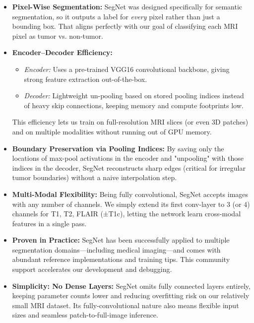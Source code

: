 \begin{itemize}
    \item \textbf{Pixel-Wise Segmentation:} SegNet was designed specifically for semantic segmentation, so it outputs a label for \emph{every} pixel rather than just a bounding box. That aligns perfectly with our goal of classifying each MRI pixel as tumor vs. non-tumor.
    
    \item \textbf{Encoder–Decoder Efficiency:}
    \begin{itemize}
        \item \emph{Encoder:} Uses a pre-trained VGG16 convolutional backbone, giving strong feature extraction out-of-the-box.
        \item \emph{Decoder:} Lightweight un-pooling based on stored pooling indices instead of heavy skip connections, keeping memory and compute footprints low.
    \end{itemize}
    This efficiency lets us train on full-resolution MRI slices (or even 3D patches) and on multiple modalities without running out of GPU memory.
    
    \item \textbf{Boundary Preservation via Pooling Indices:} By saving only the locations of max-pool activations in the encoder and "unpooling" with those indices in the decoder, SegNet reconstructs sharp edges (critical for irregular tumor boundaries) without a naive interpolation step.
    
    \item \textbf{Multi-Modal Flexibility:} Being fully convolutional, SegNet accepts images with any number of channels. We simply extend its first conv-layer to 3 (or 4) channels for T1, T2, FLAIR (±T1c), letting the network learn cross-modal features in a single pass.
    
    \item \textbf{Proven in Practice:} SegNet has been successfully applied to multiple segmentation domains—including medical imaging—and comes with abundant reference implementations and training tips. This community support accelerates our development and debugging.
    
    \item \textbf{Simplicity: No Dense Layers:} SegNet omits fully connected layers entirely, keeping parameter counts lower and reducing overfitting risk on our relatively small MRI dataset. Its fully-convolutional nature also means flexible input sizes and seamless patch-to-full-image inference.
\end{itemize}

